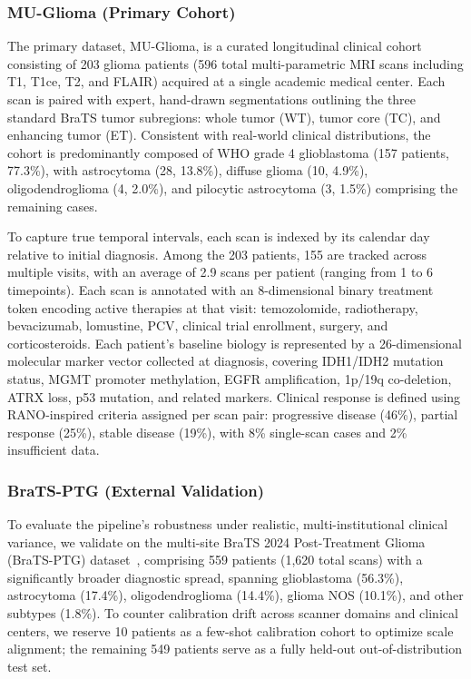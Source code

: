 \documentclass[conference]{IEEEtran}
\begin{document}
\subsubsection{MU-Glioma (Primary Cohort)}
The primary dataset, MU-Glioma, is a curated longitudinal clinical cohort consisting of 203 glioma patients (596 total multi-parametric MRI scans including T1, T1ce, T2, and FLAIR) acquired at a single academic medical center. Each scan is paired with expert, hand-drawn segmentations outlining the three standard BraTS tumor subregions: whole tumor (WT), tumor core (TC), and enhancing tumor (ET). Consistent with real-world clinical distributions, the cohort is predominantly composed of WHO grade 4 glioblastoma (157 patients, 77.3\%), with astrocytoma (28, 13.8\%), diffuse glioma (10, 4.9\%), oligodendroglioma (4, 2.0\%), and pilocytic astrocytoma (3, 1.5\%) comprising the remaining cases.

To capture true temporal intervals, each scan is indexed by its calendar day relative to initial diagnosis. Among the 203 patients, 155 are tracked across multiple visits, with an average of 2.9 scans per patient (ranging from 1 to 6 timepoints). Each scan is annotated with an 8-dimensional binary treatment token encoding active therapies at that visit: temozolomide, radiotherapy, bevacizumab, lomustine, PCV, clinical trial enrollment, surgery, and corticosteroids. Each patient's baseline biology is represented by a 26-dimensional molecular marker vector collected at diagnosis, covering IDH1/IDH2 mutation status, MGMT promoter methylation, EGFR amplification, 1p/19q co-deletion, ATRX loss, p53 mutation, and related markers. Clinical response is defined using RANO-inspired criteria assigned per scan pair: progressive disease (46\%), partial response (25\%), stable disease (19\%), with 8\% single-scan cases and 2\% insufficient data.

\subsubsection{BraTS-PTG (External Validation)}
To evaluate the pipeline's robustness under realistic, multi-institutional clinical variance, we validate on the multi-site BraTS 2024 Post-Treatment Glioma (BraTS-PTG) dataset~\cite{deverdier2024bratsptg}, comprising 559 patients (1,620 total scans) with a significantly broader diagnostic spread, spanning glioblastoma (56.3\%), astrocytoma (17.4\%), oligodendroglioma (14.4\%), glioma NOS (10.1\%), and other subtypes (1.8\%). To counter calibration drift across scanner domains and clinical centers, we reserve 10 patients as a few-shot calibration cohort to optimize scale alignment; the remaining 549 patients serve as a fully held-out out-of-distribution test set.
\end{document}
